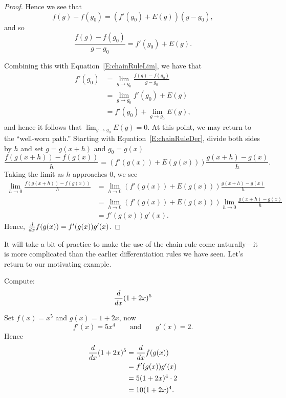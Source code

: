 \begin{proof}
\vspace{2cm}

Hence we see that
\begin{equation}\label{E:chainRuleDer}
f(g)-f(g_0) = \left(f'(g_0) + E(g)\right)(g-g_0),
\end{equation}
and so
\[
\frac{f(g)-f(g_0)}{g-g_0} = f'(g_0) + E(g).
\]


Combining this with Equation~\ref{E:chainRuleLim}, we have that
\begin{align*}
f'(g_0) &= \lim_{g\to g_0}\frac{f(g)-f(g_0)}{g-g_0} \\
&= \lim_{g\to g_0}f'(g_0) + E(g)\\
&= f'(g_0) + \lim_{g\to g_0} E(g),
\end{align*}
and hence it follows that $\lim_{g\to g_0} E(g) = 0$. At this point,
we may return to the ``well-worn path.'' Starting with
Equation~\ref{E:chainRuleDer}, divide both sides by $h$ and set
$g=g(x+h)$ and $g_0=g(x)$
\[
\frac{f(g(x+h))-f(g(x))}{h} = \left(f'(g(x)) +
E(g(x))\right)\frac{g(x+h)-g(x)}{h}.
\]
Taking the limit as $h$ approaches $0$, we see 
\begin{align*}
\lim_{h\to 0}\frac{f(g(x+h))-f(g(x))}{h} &= \lim_{h\to 0}\left(f'(g(x))
+ E(g(x))\right)\frac{g(x+h)-g(x)}{h}\\
&= \lim_{h\to 0}\left(f'(g(x))
+ E(g(x))\right)\lim_{h\to 0}\frac{g(x+h)-g(x)}{h}\\
&= f'(g(x))g'(x).
\end{align*}
Hence, $\frac{d}{dx} f(g(x))= f'(g(x))g'(x)$.
\end{proof}


It will take a bit of practice to make the use of the chain rule come
naturally---it is more complicated than the earlier differentiation
rules we have seen. Let's return to our motivating example.

\begin{example}
Compute:
\[
\frac{d}{dx} (1+2x)^5
\]
\end{example}

\begin{solution}
Set $f(x) = x^5$ and $g(x) = 1+2x$, now
\[
f'(x) = 5x^4 \qquad\text{and}\qquad g'(x) = 2.
\]
Hence
\begin{align*}
\frac{d}{dx} (1+2x)^5 &= \frac{d}{dx} f(g(x))\\ 
&=f'(g(x))g'(x) \\
&= 5(1+2x)^4\cdot 2\\
&= 10(1+2x)^4.
\end{align*}
\end{solution}


